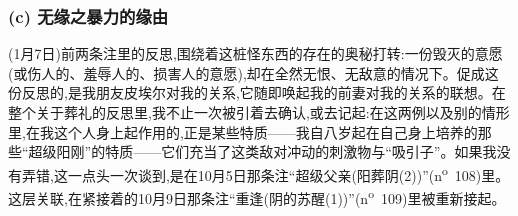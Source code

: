 \subsubsection*{(c) 无缘之暴力的缘由}
\label{ch18:local:h73}

\label{ch18:local:n68}

(1月7日)前两条注里的反思,围绕着这桩怪东西的存在的奥秘打转:一份毁灭的意愿(或伤人的、羞辱人的、损害人的意愿),却在全然无恨、无敌意的情况下。促成这份反思的,是我朋友皮埃尔对我的关系,它随即唤起我的前妻对我的关系的联想。在整个关于葬礼的反思里,我不止一次被引着去确认,或去记起:在这两例以及别的情形里,在我这个人身上起作用的,正是某些特质——我自八岁起在自己身上培养的那些“超级阳刚”的特质——它们充当了这类敌对冲动的刺激物与“吸引子”。如果我没有弄错,这一点头一次谈到,是在10月5日那条注“超级父亲(阳葬阴(2))”(n\textsuperscript{o}~108)里。这层关联,在紧接着的10月9日那条注“重逢(阴的苏醒(1))”(n\textsuperscript{o}~109)里被重新接起。

